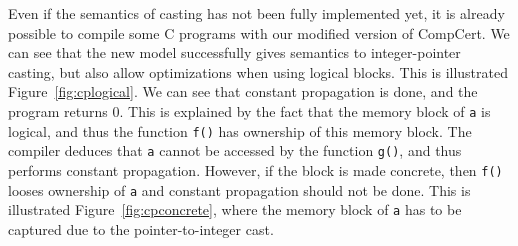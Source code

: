 Even if the semantics of casting has not been fully implemented yet, it is already possible to compile some C programs with our modified version of CompCert. We can see that the new model successfully gives semantics to integer-pointer casting, but also allow optimizations when using logical blocks.
This is illustrated Figure~\ref{fig:cplogical}. We can see that constant propagation is done, and the program returns 0. This is explained by the fact that the memory block of \texttt{a} is logical, and thus the function \texttt{f()} has ownership of this memory block. The compiler deduces that \texttt{a} cannot be accessed by the function \texttt{g()}, and thus performs constant propagation.
However, if the block is made concrete, then \texttt{f()} looses ownership of \texttt{a} and constant propagation should not be done. This is illustrated Figure~\ref{fig:cpconcrete}, where the memory block of \texttt{a} has to be captured due to the pointer-to-integer cast.
